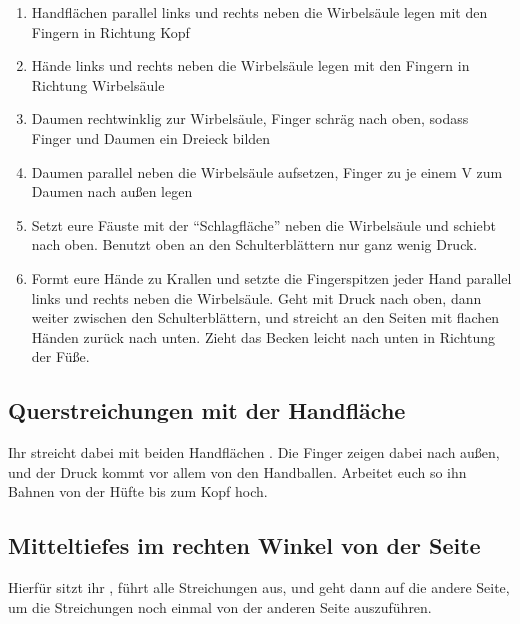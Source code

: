 \begin{enumerate}
  \item {} Handflächen parallel links und rechts neben die Wirbelsäule legen mit den Fingern in Richtung Kopf
  \item {} Hände links und rechts neben die Wirbelsäule legen mit den Fingern in Richtung Wirbelsäule
  \item {} Daumen rechtwinklig zur Wirbelsäule, Finger schräg nach oben, sodass Finger und Daumen ein Dreieck bilden
  \item {} Daumen parallel neben die Wirbelsäule aufsetzen, Finger zu je einem V zum Daumen nach außen legen
  \item {} Setzt eure Fäuste mit der ``Schlagfläche'' neben die Wirbelsäule und schiebt nach oben. Benutzt oben an den Schulterblättern nur ganz wenig Druck.
  \item {} Formt eure Hände zu Krallen und setzte die Fingerspitzen jeder Hand parallel links und rechts neben die Wirbelsäule. Geht mit Druck nach oben, dann weiter zwischen den Schulterblättern, und streicht an den Seiten mit flachen Händen zurück nach unten. Zieht das Becken leicht nach unten in Richtung der Füße.
\end{enumerate}


\subsection{Querstreichungen mit der Handfläche}

Ihr streicht dabei mit beiden Handflächen . Die Finger zeigen dabei nach außen, und der Druck kommt vor allem von den Handballen. Arbeitet euch so ihn Bahnen von der Hüfte bis zum Kopf hoch.


\subsection{Mitteltiefes im rechten Winkel von der Seite}
Hierfür sitzt ihr , führt alle Streichungen aus, und geht dann auf die andere Seite, um die Streichungen noch einmal von der anderen Seite auszuführen.

